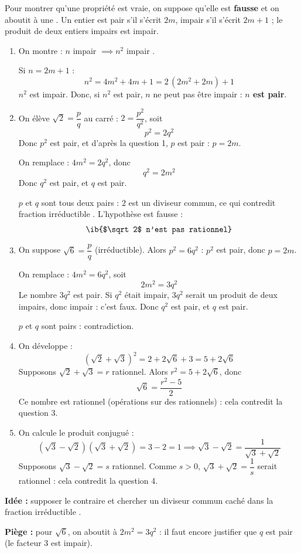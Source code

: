 \begin{prop}
Pour montrer qu'une propriété est vraie, on suppose qu'elle est \textbf{fausse} et on aboutit à une . Un entier est pair s'il s'écrit $2m$, impair s'il s'écrit $2m+1$ ; le produit de deux entiers impairs est impair.
\end{prop}
\begin{enumerate}
  \item On montre : \og $n$ impair $\implies n^2$ impair \fg{}.

  Si $n=2m+1$ :
  \[n^2=4m^2+4m+1=2\,(2m^2+2m)+1\]
  $n^2$ est impair. Donc, si $n^2$ est pair, $n$ ne peut pas être impair : \textbf{$n$ est pair}.

  \item On élève $\sqrt2=\dfrac pq$ au carré : $2=\dfrac{p^2}{q^2}$, soit
  \[p^2=2q^2\]
  Donc $p^2$ est pair, et d'après la question 1, $p$ est pair : $p=2m$.

  On remplace : $4m^2=2q^2$, donc
  \[q^2=2m^2\]
  Donc $q^2$ est pair, et $q$ est pair.

  $p$ et $q$ sont tous deux pairs : $2$ est un diviseur commun, ce qui contredit \og fraction irréductible \fg{}. L'hypothèse est fausse :
  \[\ib{$\sqrt2$ n'est pas rationnel}\]

  \item On suppose $\sqrt6=\dfrac pq$ (irréductible). Alors $p^2=6q^2$ : $p^2$ est pair, donc $p=2m$.

  On remplace : $4m^2=6q^2$, soit
  \[2m^2=3q^2\]
  Le nombre $3q^2$ est pair. Si $q^2$ était impair, $3q^2$ serait un produit de deux impairs, donc impair : c'est faux. Donc $q^2$ est pair, et $q$ est pair.

  $p$ et $q$ sont pairs : contradiction. 

  \item On développe :
  \[(\sqrt2+\sqrt3)^2=2+2\sqrt6+3=5+2\sqrt6\]
  Supposons $\sqrt2+\sqrt3=r$ rationnel. Alors $r^2=5+2\sqrt6$, donc
  \[\sqrt6=\dfrac{r^2-5}2\]
  Ce nombre est rationnel (opérations sur des rationnels) : cela contredit la question 3.


  \item On calcule le produit conjugué :
  \[(\sqrt3-\sqrt2)(\sqrt3+\sqrt2)=3-2=1\implies\sqrt3-\sqrt2=\dfrac1{\sqrt3+\sqrt2}\]
  Supposons $\sqrt3-\sqrt2=s$ rationnel. Comme $s>0$, $\sqrt3+\sqrt2=\dfrac1s$ serait rationnel : cela contredit la question 4.

\end{enumerate}
\textbf{Idée :} supposer le contraire et chercher un diviseur commun caché dans la fraction \og irréductible \fg{}.

\textbf{Piège :} pour $\sqrt6$, on aboutit à $2m^2=3q^2$ : il faut encore justifier que $q$ est pair (le facteur $3$ est impair).
